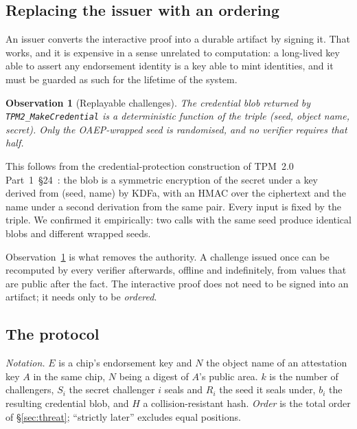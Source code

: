 \documentclass[conference,10pt]{IEEEtran}
\newtheorem{observation}{Observation}
\begin{document}
\subsection{Replacing the issuer with an ordering}

An issuer converts the interactive proof into a durable artifact by signing it. That works, and it is
expensive in a sense unrelated to computation: a long-lived key able to assert any endorsement identity
is a key able to mint identities, and it must be guarded as such for the lifetime of the system.

\begin{observation}[Replayable challenges]
\label{obs:det}
The credential blob returned by \texttt{TPM2\_MakeCredential} is a deterministic function of the triple
(seed, object name, secret). Only the OAEP-wrapped seed is randomised, and no verifier requires that
half.
\end{observation}

This follows from the credential-protection construction of TPM~2.0 Part~1~\S24~\cite{tpm2}: the blob
is a symmetric encryption of the secret under a key derived from (seed, name) by KDFa, with an HMAC over
the ciphertext and the name under a second derivation from the same pair. Every input is fixed by the
triple. We confirmed it empirically: two calls with the same seed produce identical blobs and different
wrapped seeds.

Observation~\ref{obs:det} is what removes the authority. A challenge issued once can be recomputed by
every verifier afterwards, offline and indefinitely, from values that are public after the fact. The
interactive proof does not need to be signed into an artifact; it needs only to be \emph{ordered}.

\subsection{The protocol}

\emph{Notation.} $E$ is a chip's endorsement key and $N$ the object name of an attestation key $A$ in
the same chip, $N$ being a digest of $A$'s public area. $k$ is the number of challengers, $S_i$ the
secret challenger $i$ seals and $R_i$ the seed it seals under, $b_i$ the resulting credential blob, and
$H$ a collision-resistant hash. \emph{Order} is the total order of \S\ref{sec:threat}; ``strictly
later'' excludes equal positions.
\end{document}
